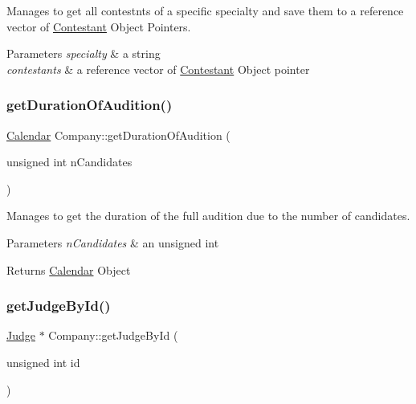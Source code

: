 Manages to get all contestnts of a specific specialty and save them to a reference vector of \hyperlink{class_contestant}{Contestant} Object Pointers. 


\begin{DoxyParams}{Parameters}
{\em specialty} & a string \\
\hline
{\em contestants} & a reference vector of \hyperlink{class_contestant}{Contestant} Object pointer \\
\hline
\end{DoxyParams}
\mbox{\label{class_company_ac51c38ee442d1b87f0eede53e2919c3a}} 
\subsubsection{\texorpdfstring{get\+Duration\+Of\+Audition()}{getDurationOfAudition()}}
{\footnotesize\ttfamily \hyperlink{class_calendar}{Calendar} Company\+::get\+Duration\+Of\+Audition (\begin{DoxyParamCaption}\item[{unsigned int}]{n\+Candidates }\end{DoxyParamCaption})}



Manages to get the duration of the full audition due to the number of candidates. 


\begin{DoxyParams}{Parameters}
{\em n\+Candidates} & an unsigned int \\
\hline
\end{DoxyParams}
\begin{DoxyReturn}{Returns}
\hyperlink{class_calendar}{Calendar} Object 
\end{DoxyReturn}
\mbox{\label{class_company_ab4135415448c7f20c5db91413ca947fd}} 
\subsubsection{\texorpdfstring{get\+Judge\+By\+Id()}{getJudgeById()}}
{\footnotesize\ttfamily \hyperlink{class_judge}{Judge} $\ast$ Company\+::get\+Judge\+By\+Id (\begin{DoxyParamCaption}\item[{unsigned int}]{id }\end{DoxyParamCaption})}



